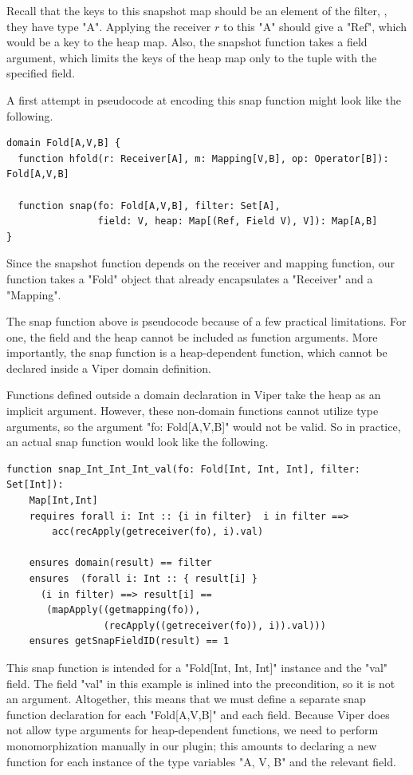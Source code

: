 \documentclass[msc,oneside]{ubcthesis}
\theoremstyle{definition}
\begin{document}
Recall that the keys to this snapshot map should be an element of the filter, \ie, they have type "A". Applying the receiver $r$ to this "A" should give a "Ref", which would be a key to the heap map. Also, the snapshot function takes a field argument, which limits the keys of the heap map only to the tuple with the specified field.

A first attempt in pseudocode at encoding this snap function might look like the following. 
\begin{lstlisting}
domain Fold[A,V,B] {
  function hfold(r: Receiver[A], m: Mapping[V,B], op: Operator[B]): Fold[A,V,B]

  function snap(fo: Fold[A,V,B], filter: Set[A], 
                field: V, heap: Map[(Ref, Field V), V]): Map[A,B]
}
\end{lstlisting}
Since the snapshot function depends on the receiver and mapping function, our function takes a "Fold" object that already encapsulates a "Receiver" and a "Mapping". 

The snap function above is pseudocode because of a few practical limitations. For one, the field and the heap cannot be included as function arguments. More importantly, the snap function is a heap-dependent function, which cannot be declared inside a Viper domain definition. 

Functions defined outside a domain declaration in Viper take the heap as an implicit argument. However, these non-domain functions cannot utilize type arguments, so the argument "fo: Fold[A,V,B]" would not be valid. So in practice, an actual snap function would look like the following.
\begin{lstlisting}
function snap_Int_Int_Int_val(fo: Fold[Int, Int, Int], filter: Set[Int]): 
    Map[Int,Int]
    requires forall i: Int :: {i in filter}  i in filter ==> 
        acc(recApply(getreceiver(fo), i).val)

    ensures domain(result) == filter
    ensures  (forall i: Int :: { result[i] }
      (i in filter) ==> result[i] ==
       (mapApply((getmapping(fo)), 
                 (recApply((getreceiver(fo)), i)).val)))
    ensures getSnapFieldID(result) == 1
\end{lstlisting}
This snap function is intended for a "Fold[Int, Int, Int]" instance and the "val" field. The field "val" in this example is inlined into the precondition, so it is not an argument. Altogether, this means that we must define a separate snap function declaration for each "Fold[A,V,B]" and each field. Because Viper does not allow type arguments for heap-dependent functions, we need to perform monomorphization manually in our plugin; this amounts to declaring a new function for each instance of the type variables "A, V, B" and the relevant field. 
\end{document}
